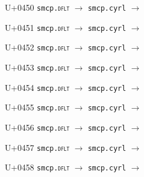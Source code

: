 \documentclass{article}
\begin{document}
\begin{substitutions}
\goodbreak

U+0450  \linebreak
    \texttt{smcp.\textsc{dflt}} $\to$  \linebreak
    \texttt{smcp.cyrl} $\to$  

\goodbreak

U+0451  \linebreak
    \texttt{smcp.\textsc{dflt}} $\to$  \linebreak
    \texttt{smcp.cyrl} $\to$  

\goodbreak

U+0452  \linebreak
    \texttt{smcp.\textsc{dflt}} $\to$  \linebreak
    \texttt{smcp.cyrl} $\to$  

\goodbreak

U+0453  \linebreak
    \texttt{smcp.\textsc{dflt}} $\to$  \linebreak
    \texttt{smcp.cyrl} $\to$  

\goodbreak

U+0454  \linebreak
    \texttt{smcp.\textsc{dflt}} $\to$  \linebreak
    \texttt{smcp.cyrl} $\to$  

\goodbreak

U+0455  \linebreak
    \texttt{smcp.\textsc{dflt}} $\to$  \linebreak
    \texttt{smcp.cyrl} $\to$  

\goodbreak

U+0456  \linebreak
    \texttt{smcp.\textsc{dflt}} $\to$  \linebreak
    \texttt{smcp.cyrl} $\to$  

\goodbreak

U+0457  \linebreak
    \texttt{smcp.\textsc{dflt}} $\to$  \linebreak
    \texttt{smcp.cyrl} $\to$  

\goodbreak

U+0458  \linebreak
    \texttt{smcp.\textsc{dflt}} $\to$  \linebreak
    \texttt{smcp.cyrl} $\to$  


\end{substitutions}
\end{document}
